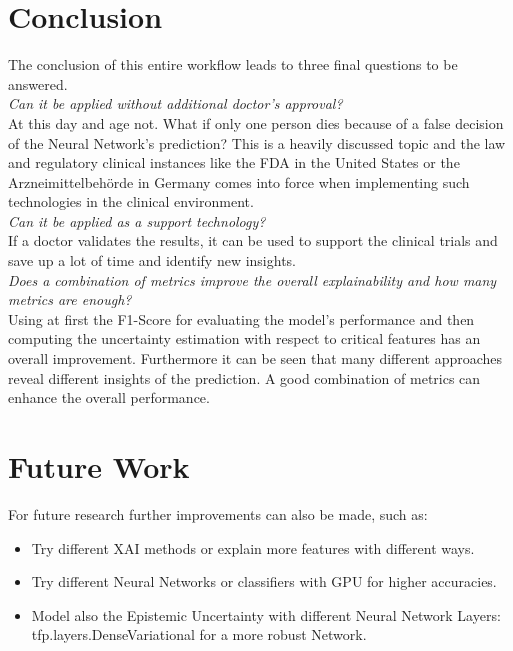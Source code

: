 \documentclass[journal]{IEEEtran}
\begin{document}
 
\section{Conclusion}
\noindent The conclusion of this entire workflow leads to three final questions to be answered. \\

\textit{Can it be applied without additional doctor’s approval?} \\

At this day and age not. What if only one person dies because of a false decision of the Neural Network's prediction? This is a heavily discussed topic and the law and regulatory clinical instances like the FDA in the United States or the Arzneimittelbehörde in Germany comes into force when implementing such technologies in the clinical environment. \\

\textit{Can it be applied as a support technology?} \\

If a doctor validates the results, it can be used to support the clinical trials and save up a lot of time and identify new insights. \\

\textit{Does a combination of metrics improve the overall explainability and how many metrics are enough?} \\ 

Using at first the F1-Score for evaluating the model's performance and then computing the uncertainty estimation with respect to critical features has an overall improvement. Furthermore it can be seen that many different approaches reveal different insights of the prediction. A good combination of metrics can enhance the overall performance.


\section{Future Work}
\noindent For future research further improvements can also be made, such as: \\

\begin{itemize}
	\item Try different XAI methods or explain more features with different ways.
	\item Try different Neural Networks or classifiers with GPU for higher accuracies.
	\item Model also the Epistemic Uncertainty with different Neural Network Layers: tfp.layers.DenseVariational for a more robust Network.
\end{itemize}
\end{document}
